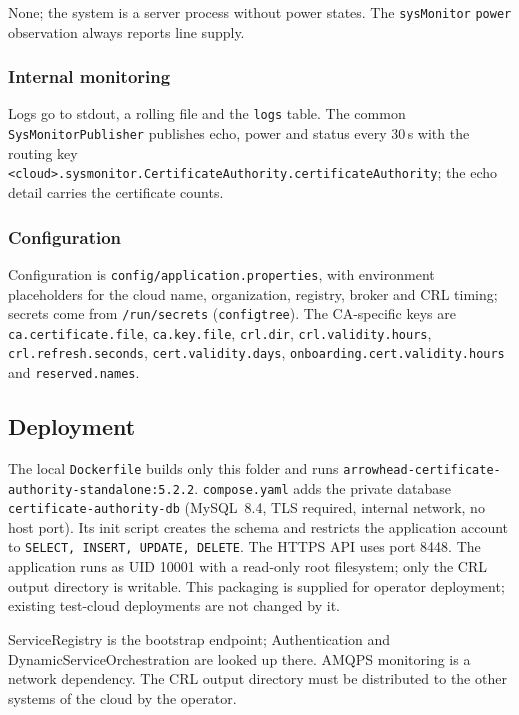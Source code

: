 \documentclass[a4paper]{arrowhead}
\begin{document}
None; the system is a server process without power states. The \texttt{sysMonitor} \texttt{power} observation always reports line supply.

\subsubsection{Internal monitoring}

Logs go to stdout, a rolling file and the \texttt{logs} table. The common \texttt{SysMonitor\allowbreak{}Publisher} publishes echo, power and status every 30\,s with the routing key \texttt{<cloud>.sysmonitor.\allowbreak{}CertificateAuthority.\allowbreak{}certificateAuthority}; the echo detail carries the certificate counts.

\subsubsection{Configuration}

Configuration is \texttt{config/\allowbreak{}application.\allowbreak{}properties}, with environment placeholders for the cloud name, organization, registry, broker and CRL timing; secrets come from \texttt{/run/secrets} (\texttt{configtree}). The CA-specific keys are \texttt{ca.certificate.file}, \texttt{ca.key.file}, \texttt{crl.dir}, \texttt{crl.validity.hours}, \texttt{crl.refresh.seconds}, \texttt{cert.validity.days}, \texttt{onboarding.cert.validity.hours} and \texttt{reserved.names}.

\subsection{Deployment}

The local \texttt{Dockerfile} builds only this folder and runs \texttt{arrowhead-\allowbreak{}certificate-\allowbreak{}authority-\allowbreak{}standalone:5.2.2}. \texttt{compose.yaml} adds the private database \texttt{certificate-\allowbreak{}authority-\allowbreak{}db} (MySQL~8.4, TLS required, internal network, no host port). Its init script creates the schema and restricts the application account to \texttt{SELECT, INSERT, UPDATE, DELETE}. The HTTPS API uses port 8448. The application runs as UID 10001 with a read-only root filesystem; only the CRL output directory is writable. This packaging is supplied for operator deployment; existing test-cloud deployments are not changed by it.

ServiceRegistry is the bootstrap endpoint; Authentication and DynamicServiceOrchestration are looked up there. AMQPS monitoring is a network dependency. The CRL output directory must be distributed to the other systems of the cloud by the operator.
\end{document}

